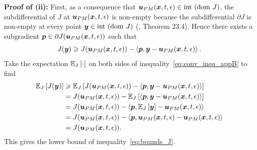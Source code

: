 \textbf{Proof of (ii):} First, as a consequence that $\boldsymbol{u}_{PM}(\boldsymbol{x},t,\epsilon) \in \mathrm{int~}(\mathrm{dom~} J)$, the subdifferential of $J$ at $\boldsymbol{u}_{PM}(\boldsymbol{x},t,\epsilon)$ is non-empty because the subdifferential $\partial J$ is non-empty at every point $\boldsymbol{y} \in \mathrm{int~} (\mathrm{dom~} J)$ (\citep{rockafellar1970convex}, Theorem 23.4). Hence there exists a subgradient $\boldsymbol{p} \in \partial J(\boldsymbol{u}_{PM}(\boldsymbol{x},t,\epsilon))$ such that
\begin{equation}\label{eq:conv_ineq_appB}
    J(\boldsymbol{y})\geqslant J(\boldsymbol{u}_{PM}(\boldsymbol{x},t,\epsilon))-\left\langle \boldsymbol{p},\boldsymbol{y}-\boldsymbol{u}_{PM}(\boldsymbol{x},t,\epsilon)\right\rangle.
\end{equation}
Take the expectation $\mathbb{E}_{J}\left [{\cdot}\right]$ on both sides of inequality~\eqref{eq:conv_ineq_appB} to find
\begin{equation}\label{eq:ineq1_appB}
\begin{alignedat}{1}
    \mathbb{E}_{J}\left [{J(\boldsymbol{y})}\right] &\geqslant \mathbb{E}_{J}\left [{J(\boldsymbol{u}_{PM}(\boldsymbol{x},t,\epsilon))-\left\langle \boldsymbol{p},\boldsymbol{y}-\boldsymbol{u}_{PM}(\boldsymbol{x},t,\epsilon)\right\rangle}\right] \\
    &= J(\boldsymbol{u}_{PM}(\boldsymbol{x},t,\epsilon))-\mathbb{E}_{J}\left [{\left\langle \boldsymbol{p},\boldsymbol{y}-\boldsymbol{u}_{PM}(\boldsymbol{x},t,\epsilon)\right\rangle}\right]\\
    &= J(\boldsymbol{u}_{PM}(\boldsymbol{x},t,\epsilon))-\left\langle \boldsymbol{p},\mathbb{E}_{J}\left [{\boldsymbol{y}}\right]-\boldsymbol{u}_{PM}(\boldsymbol{x},t,\epsilon)\right\rangle \\
    &= J(\boldsymbol{u}_{PM}(\boldsymbol{x},t,\epsilon))-\left\langle \boldsymbol{p},\boldsymbol{u}_{PM}(\boldsymbol{x},t,\epsilon)-\boldsymbol{u}_{PM}(\boldsymbol{x},t,\epsilon)\right\rangle  \\
    &= J(\boldsymbol{u}_{PM}(\boldsymbol{x},t,\epsilon)).
\end{alignedat}
\end{equation}
This gives the lower bound of inequality~\eqref{eq:bounds_J}.

